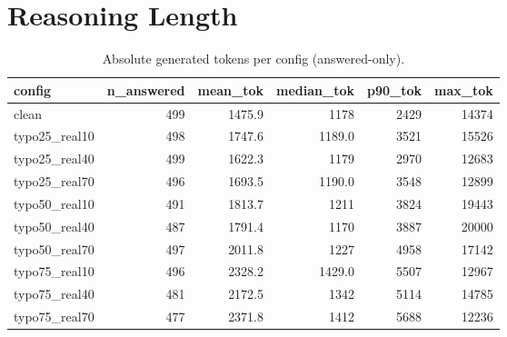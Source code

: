 \documentclass[11pt]{article}
\begin{document}
\section*{Reasoning Length}
\begin{table}[H]
\centering
\caption{Absolute generated tokens per config (answered-only).}
\small
\begin{adjustbox}{max width=\textwidth}
\begin{tabular}{lrrrrr}
\toprule
\textbf{config} & \textbf{n\_answered} & \textbf{mean\_tok} & \textbf{median\_tok} & \textbf{p90\_tok} & \textbf{max\_tok} \\
\midrule
clean & 499 & 1475.9 & 1178 & 2429 & 14374 \\
typo25\_real10 & 498 & 1747.6 & 1189.0 & 3521 & 15526 \\
typo25\_real40 & 499 & 1622.3 & 1179 & 2970 & 12683 \\
typo25\_real70 & 496 & 1693.5 & 1190.0 & 3548 & 12899 \\
typo50\_real10 & 491 & 1813.7 & 1211 & 3824 & 19443 \\
typo50\_real40 & 487 & 1791.4 & 1170 & 3887 & 20000 \\
typo50\_real70 & 497 & 2011.8 & 1227 & 4958 & 17142 \\
typo75\_real10 & 496 & 2328.2 & 1429.0 & 5507 & 12967 \\
typo75\_real40 & 481 & 2172.5 & 1342 & 5114 & 14785 \\
typo75\_real70 & 477 & 2371.8 & 1412 & 5688 & 12236 \\
\bottomrule
\end{tabular}
\end{adjustbox}
\end{table}
\end{document}
